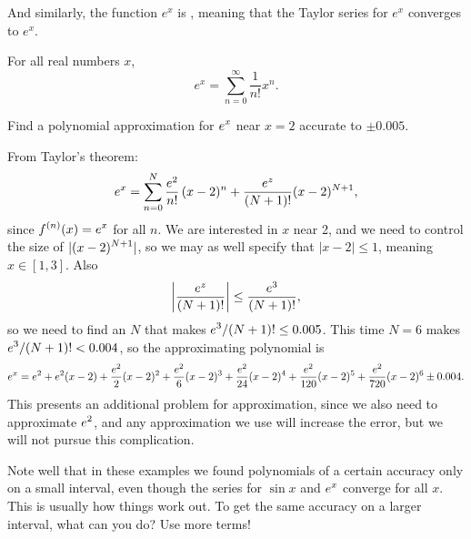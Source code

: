 And similarly, the function $e^x$ is ,
meaning that the Taylor series for $e^x$ converges to $e^x$.
\begin{theorem}\label{thm:exp-is-analytic}
  For all real numbers $x$,
  $$
  e^x = \sum_{n=0}^\infty \frac{1}{n!} x^{n}.
  $$  
\end{theorem}


\begin{example} Find a polynomial approximation for $\displaystyle e^x$ near $x=2$
accurate to $\pm
0.005$. 
\end{example}
\begin{solution}
From Taylor's theorem:
$$
  e^x= \sum_{n=0}^N{e^2\over n!}\,(x-2)^n + 
  {e^z\over (N+1)!}(x-2)^{N+1},
$$
since $\displaystyle f^{(n)}(x)=e^x$ for all $n$. We are interested in $x$ near
2, and we need to control the size of $\displaystyle |(x-2)^{N+1}|$, so we may
as well specify that $|x-2|\le 1$, meaning $x\in[1,3]$.  Also
$$\left|{e^z\over (N+1)!}\right|\le {e^3\over (N+1)!},$$
so we need to find an $N$ that makes $\displaystyle e^3/(N+1)!\le 0.005$. This time
$N=6$ makes $\displaystyle e^3/(N+1)!< 0.004$, so the approximating polynomial is
$$
  e^x=e^2+e^2(x-2)+{e^2\over2}(x-2)^2+{e^2\over6}(x-2)^3+
  {e^2\over24}(x-2)^4+{e^2\over120}(x-2)^5+{e^2\over720}(x-2)^6
  \pm 0.004.
$$
This presents an additional problem for approximation, since we also
need to approximate $\displaystyle e^2$, and any approximation we use will increase
the error, but we will not pursue this complication.
\end{solution}

Note well that in these examples we found polynomials of a certain
accuracy only on a small interval, even though the series for $\sin x$
and $\displaystyle e^x$ converge for all $x$.  This is usually how things work
out.  To get the same accuracy on a larger interval, what can you do?
Use more terms!

